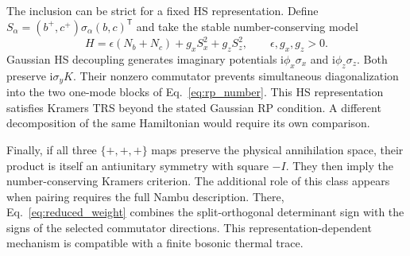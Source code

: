 \documentclass[11pt,a4paper]{article}
\newcommand{\ii}{\mathrm{i}}
\newcommand{\trans}{\mathsf{T}}
\begin{document}
The inclusion can be strict for a fixed HS representation. Define
$S_\alpha=(b^{+},c^{+})\sigma_\alpha(b,c)^\trans$ and take the stable
number-conserving model
\begin{equation}
    H=\epsilon(N_b+N_c)+g_xS_x^2+g_zS_z^2,
    \qquad \epsilon,g_x,g_z>0.
    \label{eq:trs_example}
\end{equation}
Gaussian HS decoupling generates imaginary potentials
$\ii\phi_x\sigma_x$ and $\ii\phi_z\sigma_z$. Both preserve
$\ii\sigma_yK$. Their nonzero commutator prevents simultaneous
diagonalization into the two one-mode blocks of Eq.~\eqref{eq:rp_number}.
This HS representation satisfies Kramers TRS beyond the stated Gaussian
RP condition. A different decomposition of the same Hamiltonian would
require its own comparison.

Finally, if all three $\{+,+,+\}$ maps preserve the physical annihilation
space, their product is itself an antiunitary symmetry with square $-I$.
They then imply the number-conserving Kramers criterion. The additional
role of this class appears when pairing requires the full Nambu
description. There, Eq.~\eqref{eq:reduced_weight} combines the
split-orthogonal determinant sign with the signs of the selected
commutator directions. This representation-dependent mechanism is
compatible with a finite bosonic thermal trace.



\end{document}
